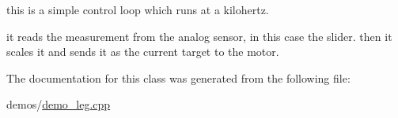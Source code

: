 this is a simple control loop which runs at a kilohertz. 

it reads the measurement from the analog sensor, in this case the slider. then it scales it and sends it as the current target to the motor. 

The documentation for this class was generated from the following file\+:\begin{DoxyCompactItemize}
\item 
demos/\hyperlink{demo__leg_8cpp}{demo\+\_\+leg.\+cpp}\end{DoxyCompactItemize}
